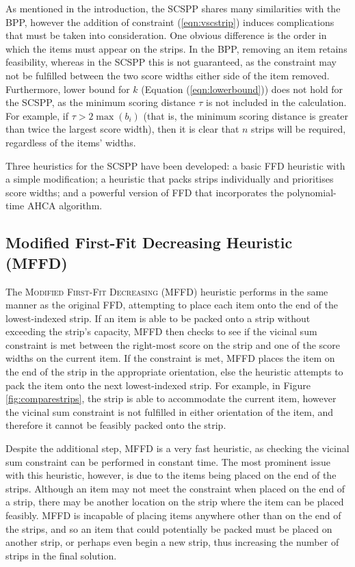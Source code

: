 \documentclass[oribibl]{llncs}
\begin{document}
As mentioned in the introduction, the SCSPP shares many similarities with the BPP, however the addition of constraint (\ref{eqn:vscstrip}) induces complications that must be taken into consideration. One obvious difference is the order in which the items must appear on the strips. In the BPP, removing an item retains feasibility, whereas in the SCSPP this is not guaranteed, as the constraint may not be fulfilled between the two score widths either side of the item removed. Furthermore, lower bound for $k$ (Equation (\ref{eqn:lowerbound})) does not hold for the SCSPP, as the minimum scoring distance $\tau$ is not included in the calculation. For example, if $\tau > 2 \max(b_i)$ (that is, the minimum scoring distance is greater than twice the largest score width), then it is clear that $n$ strips will be required, regardless of the items' widths.

Three heuristics for the SCSPP have been developed: a basic FFD heuristic with a simple modification; a heuristic that packs strips individually and prioritises score widths; and a powerful version of FFD that incorporates the polynomial-time AHCA algorithm.

\subsection{Modified First-Fit Decreasing Heuristic (MFFD)}
\label{sec:mffd}
The \textsc{Modified First-Fit Decreasing} (MFFD) heuristic performs in the same manner as the original FFD, attempting to place each item onto the end of the lowest-indexed strip. If an item is able to be packed onto a strip without exceeding the strip's capacity, MFFD then checks to see if the vicinal sum constraint is met between the right-most score on the strip and one of the score widths on the current item. If the constraint is met, MFFD places the item on the end of the strip in the appropriate orientation, else the heuristic attempts to pack the item onto the next lowest-indexed strip. For example, in Figure \ref{fig:comparestrips}, the strip is able to accommodate the current item, however the vicinal sum constraint is not fulfilled in either orientation of the item, and therefore it cannot be feasibly packed onto the strip.

Despite the additional step, MFFD is a very fast heuristic, as checking the vicinal sum constraint can be performed in constant time. The most prominent issue with this heuristic, however, is due to the items being placed on the end of the strips. Although an item may not meet the constraint when placed on the end of a strip, there may be another location on the strip where the item can be placed feasibly. MFFD is incapable of placing items anywhere other than on the end of the strips, and so an item that could potentially be packed must be placed on another strip, or perhaps even begin a new strip, thus increasing the number of strips in the final solution.
\end{document}
